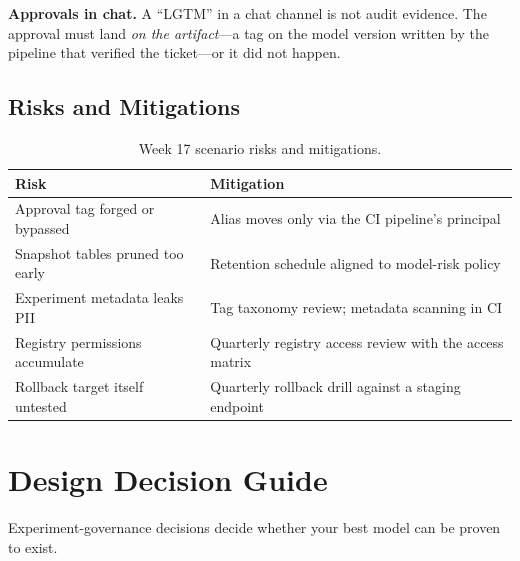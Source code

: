 \begin{pitfall}
\textbf{Approvals in chat.} A ``LGTM'' in a chat channel is not audit evidence. The approval must land \emph{on the artifact}---a tag on the model version written by the pipeline that verified the ticket---or it did not happen.
\end{pitfall}

\subsection{Risks and Mitigations}
\begin{table}[H]
\centering
\small
\begin{tabular}{@{}p{4.6cm}p{7.6cm}@{}}
\toprule
\textbf{Risk} & \textbf{Mitigation} \\
\midrule
Approval tag forged or bypassed & Alias moves only via the CI pipeline's principal \\
Snapshot tables pruned too early & Retention schedule aligned to model-risk policy \\
Experiment metadata leaks PII & Tag taxonomy review; metadata scanning in CI \\
Registry permissions accumulate & Quarterly registry access review with the access matrix \\
Rollback target itself untested & Quarterly rollback drill against a staging endpoint \\
\bottomrule
\end{tabular}
\caption{Week 17 scenario risks and mitigations.}
\label{tab:ch17-risks}
\end{table}

\section{Design Decision Guide}
%
Experiment-governance decisions decide whether your best model can be proven to exist.

